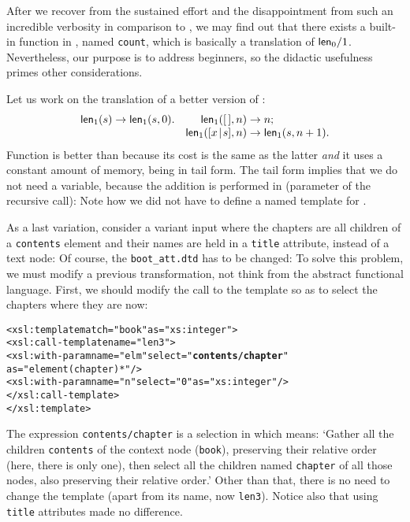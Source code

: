 After we recover from the sustained effort and the disappointment from
such an incredible verbosity in comparison to \Erlang, we may find out
that there exists a built\hyp{}in function in \XPath, named
\texttt{count}, which is basically a translation of
\(\textsf{len}_0/1\). Nevertheless, our purpose is to address beginners,
so the didactic usefulness primes other considerations.

Let us work on the translation of a better version of
:
\begin{equation*}
\begin{array}{@{}r@{\;}l@{\;}lr@{\;}l@{\;}l@{}}
\fun{len}_1(s) & \rightarrow & \fun{len}_1(s,0). &
\fun{len}_1(\el,n) & \rightarrow & n;\\
&&& \fun{len}_1(\cons{x}{s},n) & \rightarrow & \fun{len}_1(s,n+1).
\end{array}
\end{equation*}
Function  is better than  because
its cost is the same as the latter \emph{and} it uses a constant
amount of memory, being in tail form. The tail form implies that we do
not need a variable, because the addition is performed in \XPath
(parameter of the recursive call):
\noindent Note how we did not have to define a named template for
.

As a last variation, consider a variant input where the chapters are
all children of a \texttt{contents} element and their names are held
in a \texttt{title} attribute, instead of a text node:
\noindent Of course, the \DTD \texttt{boot\_att.dtd} has to be
changed: 
\noindent To solve this problem, we must modify a previous \XSLT 
transformation, not think from the abstract functional language.
First, we should modify the call to the template so as to select the
chapters where they are now:
\begin{alltt}
  <xsl:template match="book" as="xs:integer">
    <xsl:call-template name="len3">
      <xsl:with-param name="elm" select="\textbf{contents/chapter}"
                                 as="element(chapter)*"/>
      <xsl:with-param name="n" select="0" as="xs:integer"/>
    </xsl:call-template>
  </xsl:template>
\end{alltt}
The expression \texttt{contents/chapter} is a selection in \XPath
which means: `Gather all the children \texttt{contents} of the context
node (\texttt{book}), preserving their relative order (here, there is
only one), then select all the children named \texttt{chapter} of all
those nodes, also preserving their relative order.' Other than that,
there is no need to change the template (apart from its name, now
\texttt{len3}). Notice also that using \texttt{title} attributes made
no difference.

